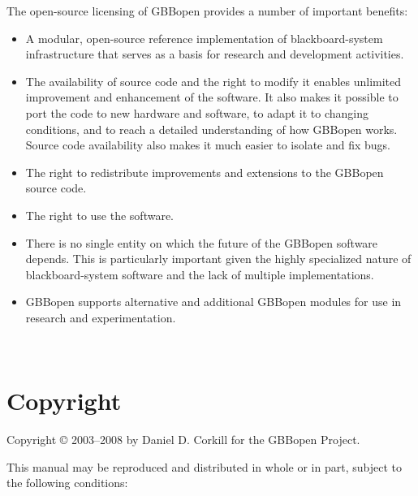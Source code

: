 \documentclass[10pt,twoside,english,pdftex]{article}
\begin{document}
{The open-source licensing of GBBopen provides a number of important benefits:
\begin{itemize}
\item A modular, open-source reference implementation of
  blackboard-system infrastructure that serves as a basis for research
  and development activities.
\item The availability of source code and the right to modify it
  enables unlimited improvement and enhancement of the software. It
  also makes it possible to port the code to new hardware and
  software, to adapt it to changing conditions, and to reach a
  detailed understanding of how GBBopen works. Source code
  availability also makes it much easier to isolate and fix bugs.
\item The right to redistribute improvements and extensions to the
  GBBopen source code.
\item The right to use the software.
\item There is no single entity on which the future of the GBBopen
  software depends. This is particularly important given the highly
  specialized nature of blackboard-system software and the lack of
  multiple implementations.
\item GBBopen supports alternative and additional GBBopen modules for
  use in research and experimentation.
\end{itemize}
}%


\T\begin{ifhtml} 
  \intro
  \setcounter{htmlautomenu}{0}
\T\end{ifhtml}

\T\thispagestyle{empty}


\T\newpage
\T~
\T\vfill
\W{}
\W\section*{Copyright}

Copyright \copyright{} 2003--2008 by Daniel D. Corkill for the
GBBopen Project.

This manual may be reproduced and distributed in whole or in
part, subject to the following conditions: 
\end{document}
